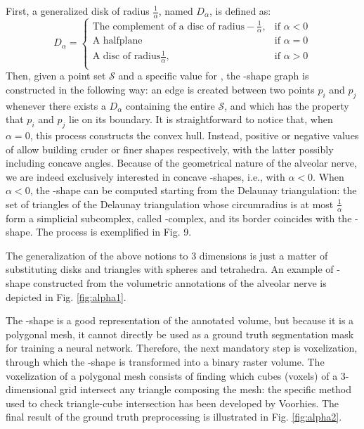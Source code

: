 First, a generalized disk of radius $\frac{1}{\alpha}$, named $D_\alpha$, is
defined as:
$$
D_\alpha=
\begin{cases}
  \text{The complement of a disc of radius} -\frac{1}{\alpha}, & \text{if $\alpha<0$}\\
  \text{A halfplane} & \text{if $\alpha=0$}\\
  \text{A disc of radius} \frac{1}{\alpha}, & \text{if $\alpha>0$}\\
\end{cases}
$$
Then, given a point set $\mathcal{S}$ and a specific value for \textalpha, the
\textalpha-shape graph is constructed in the following way: an edge is
created between two points $p_i$ and $p_j$ whenever there exists
a $D_\alpha$ containing the entire $\mathcal{S}$, and which has the property
that $p_i$ and $p_j$ lie on its boundary. It is straightforward to
notice that, when $\alpha = 0$, this process constructs the convex
hull. Instead, positive or negative values of \textalpha\;allow building
cruder or finer shapes respectively, with the latter possibly including concave
angles. Because of the geometrical nature of the alveolar nerve, we are indeed
exclusively interested in concave \textalpha-shapes, i.e., with $\alpha < 0$.
When $\alpha < 0$, the \textalpha-shape can be computed starting from the
Delaunay triangulation: the set of triangles of the Delaunay triangulation whose
circumradius is at most $\frac{1}{\alpha}$ form a simplicial subcomplex, called
\textalpha-complex, and its border coincides with the \textalpha-shape.
The process is exemplified in Fig. 9.

The generalization of the above notions to $3$ dimensions is just a matter of
substituting disks and triangles with spheres and tetrahedra. An example of
\textalpha-shape constructed from the volumetric annotations of the alveolar
nerve is depicted in Fig. \ref{fig:alpha1}.

The \textalpha-shape is a good representation of the annotated volume, but
because it is a polygonal mesh, it cannot directly be used as a ground truth
segmentation mask for training a neural network. Therefore, the next mandatory
step is voxelization, through which the \textalpha-shape is transformed into
a binary raster volume. The voxelization of a polygonal mesh consists of finding
which cubes (voxels) of a 3-dimensional grid intersect any triangle composing
the mesh: the specific method used to check triangle-cube intersection has been
developed by Voorhies. The final result of the ground truth preprocessing is
illustrated in Fig. \ref{fig:alpha2}.

